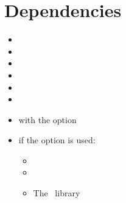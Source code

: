 \section{Dependencies}%
\begin{multicols}{2}%
  \begin{itemize}[leftmargin=10pt]
    \item {}
    \item {}
    \item {}
    \item {}
    \item {}
    \item {}
    \item {} with the  option
    \item if the  option is used:
      \begin{itemize}
        \item \TikZ
        \item {}
        \item The \TikZ\ library 
      \end{itemize}
  \end{itemize}
\end{multicols}
